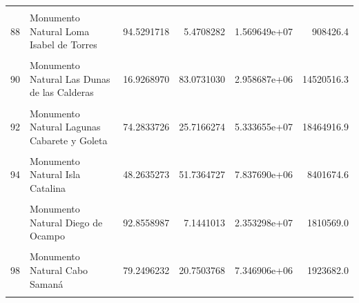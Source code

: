\documentclass[10pt,landscape,a3paper]{article}
\begin{document}
\begin{longtable}[t]{llrrrr}
\cellcolor{lightgray}{87} & \cellcolor{lightgray}{Monumento Natural Los Cacheos} & \cellcolor{lightgray}{0.8271550} & \cellcolor{lightgray}{99.1728450} & \cellcolor{lightgray}{4.613026e+05} & \cellcolor{lightgray}{55308489.8}\\
88 & Monumento Natural Loma Isabel de Torres & 94.5291718 & 5.4708282 & 1.569649e+07 & 908426.4\\
\cellcolor{lightgray}{89} & \cellcolor{lightgray}{Monumento Natural Las Marías} & \cellcolor{lightgray}{27.0243743} & \cellcolor{lightgray}{72.9756257} & \cellcolor{lightgray}{1.217374e+06} & \cellcolor{lightgray}{3287352.9}\\
90 & Monumento Natural Las Dunas de las Calderas & 16.9268970 & 83.0731030 & 2.958687e+06 & 14520516.3\\
\addlinespace
\cellcolor{lightgray}{91} & \cellcolor{lightgray}{Monumento Natural Las Caobas} & \cellcolor{lightgray}{53.9809062} & \cellcolor{lightgray}{46.0190938} & \cellcolor{lightgray}{5.693486e+07} & \cellcolor{lightgray}{48537361.9}\\
92 & Monumento Natural Lagunas Cabarete y Goleta & 74.2833726 & 25.7166274 & 5.333655e+07 & 18464916.9\\
\cellcolor{lightgray}{93} & \cellcolor{lightgray}{Monumento Natural La Tinaja} & \cellcolor{lightgray}{81.6231436} & \cellcolor{lightgray}{18.3768564} & \cellcolor{lightgray}{2.409466e+07} & \cellcolor{lightgray}{5424736.3}\\
94 & Monumento Natural Isla Catalina & 48.2635273 & 51.7364727 & 7.837690e+06 & 8401674.6\\
\cellcolor{lightgray}{95} & \cellcolor{lightgray}{Monumento Natural Hoyo Claro} & \cellcolor{lightgray}{67.0247609} & \cellcolor{lightgray}{32.9752391} & \cellcolor{lightgray}{2.633797e+07} & \cellcolor{lightgray}{12957912.7}\\
\addlinespace
96 & Monumento Natural Diego de Ocampo & 92.8558987 & 7.1441013 & 2.353298e+07 & 1810569.0\\
\cellcolor{lightgray}{97} & \cellcolor{lightgray}{Monumento Natural Cerro de San Francisco} & \cellcolor{lightgray}{90.7180705} & \cellcolor{lightgray}{9.2819295} & \cellcolor{lightgray}{3.651148e+06} & \cellcolor{lightgray}{373571.7}\\
98 & Monumento Natural Cabo Samaná & 79.2496232 & 20.7503768 & 7.346906e+06 & 1923682.0\\
\cellcolor{lightgray}{99} & \cellcolor{lightgray}{Corredor Ecologico Autopista Juan Bosch} & \cellcolor{lightgray}{22.1218962} & \cellcolor{lightgray}{77.8781038} & \cellcolor{lightgray}{1.227294e+06} & \cellcolor{lightgray}{4320574.7}\\

\end{longtable}
\end{document}
